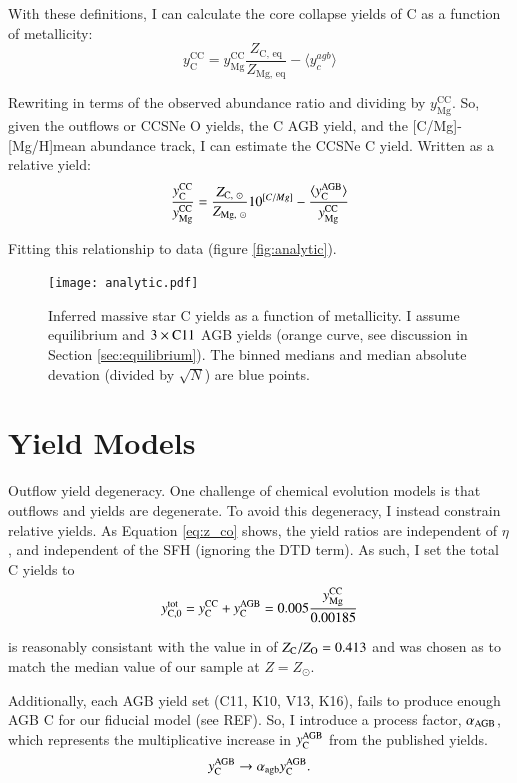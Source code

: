 \documentclass[12pt,oneside]{report}
\newcommand{\caah}{[C/Mg]-[Mg/H]}
\newcommand{\Ycc}{\ensuremath{y_{\rm C}^{\rm CC}}}
\newcommand{\Yct}{\ensuremath{y_{\rm C, 0}^{\rm tot}}}
\newcommand{\Yoc}{\ensuremath{y_{\rm Mg}^{\rm CC}}}
\newcommand{\Ycagb}{\ensuremath{y_{\rm C}^{\rm AGB}}}
\newcommand{\sun}{\ensuremath{\odot}}
\begin{document}
With these definitions, I can calculate the core collapse yields of C as a function of metallicity:
\begin{equation}
    y_\text{C}^\text{CC} =  y_\text{Mg}^\text{CC} \frac{Z_\text{C,~eq}}{Z_\text{Mg,~eq}} - \langle y_c^{agb} \rangle
\end{equation}

Rewriting in terms of the observed abundance ratio and dividing by
$y_\text{Mg}^\text{CC}$. So, given the outflows or CCSNe O yields, the
C AGB yield, and the \caah mean abundance track, I can estimate the CCSNe C yield. Written as a relative yield:
\begin{equation}
    \frac{\Ycc}{\Yoc} = \frac{Z_{\text{C},~\sun}}{Z_{\text{Mg},~\sun}} 10^{[C/Mg]} - \frac{\langle \Ycagb \rangle}{\Yoc}
\end{equation}

Fitting this relationship to data (figure \ref{fig:analytic}).

\begin{figure}
    \centering
    \texttt{[image: analytic.pdf]}
    \caption[Reverse fit yields]{Inferred massive star C yields as a function of metallicity. I assume equilibrium and $3\times {\rm C11}$ AGB yields (orange curve, see discussion in Section \ref{sec:equilibrium}). The binned medians and median absolute devation (divided by $\sqrt{N}$) are blue points.
    }
\end{figure}


\section{Yield Models}

Outflow yield degeneracy.
One challenge of chemical evolution models is that outflows and yields are degenerate. To avoid this degeneracy, I instead constrain relative yields. As Equation \ref{eq:z_co} shows, the yield ratios are independent of $\eta$, and independent of the SFH (ignoring the DTD term).
As such, I set the total C yields to 
\begin{equation}
    \Yct = \Ycc + \Ycagb = 0.005 \frac{\Yoc}{0.00185}
\end{equation}

is reasonably consistant with the value in \citet{asplund+09} of $Z_{\rm
C}/Z_{\rm O}=0.413$ and was chosen as to match the median value of our sample
at $Z=Z_{\sun }$. 

Additionally, each AGB yield set (C11, K10, V13, K16), fails to produce enough AGB C for our fiducial model (see REF). So, I introduce a process factor, $\alpha_{\rm AGB}$, which represents the multiplicative increase in $\Ycagb$ from the published yields.
\begin{equation}
    \Ycagb \rightarrow \alpha_{\rm agb}  \Ycagb.
\end{equation}
\end{document}
